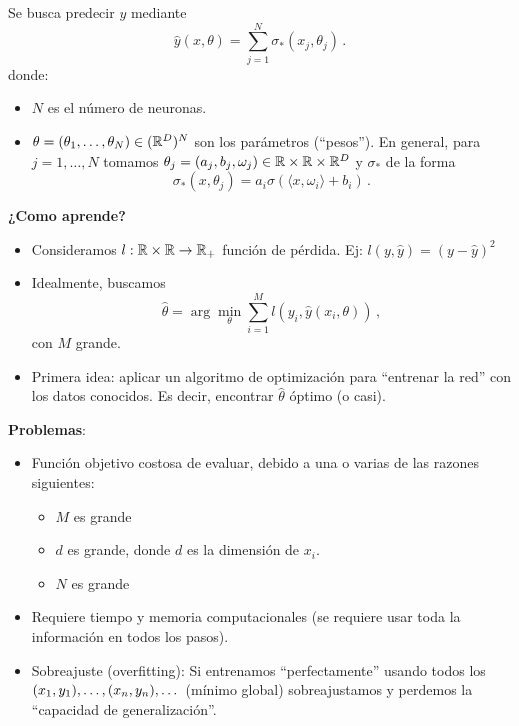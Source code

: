 \begin{example}
\label{ejemplo:red_neuronal}
Se busca predecir $y$ mediante
$$ \hat{y}(x,\theta) = \displaystyle\sum^N_{j=1}\sigma_*(x_j,\theta_j) \,.$$
donde:
\begin{itemize}
    \item $N$ es el número de neuronas.
    \item $\theta=(\theta_1,\dots,\theta_N)\in(\mathbb{R}^D)^N$ son los parámetros (``pesos'').
    \newline En general, para $j=1,\dots,N$ tomamos $\theta_j=(a_j,b_j,\omega_j)\in \mathbb{R}\times\mathbb{R}\times\mathbb{R}^D $ y $\sigma_*$ de la forma
    $$ \sigma_*(x,\theta_j)=a_i\sigma(\langle x,\omega_i\rangle+b_i) \,.$$
\end{itemize}
\textbf{¿Como aprende?}
\begin{itemize}
    \item Consideramos $l:\mathbb{R}\times\mathbb{R}\to\mathbb{R}_+$ función de pérdida.
    \newline Ej: $l(y,\hat{y})=(y-\hat{y})^2$
    \item Idealmente, buscamos
    $$ \hat{\theta}=\displaystyle\arg\min_\theta \sum^M_{i=1}l(y_i,\hat{y}(x_i,\theta))\,,$$
    con $M$ grande.
    \item Primera idea: aplicar un algoritmo de optimización para ``entrenar la red'' con los datos conocidos. Es decir, encontrar $\hat{\theta}$ óptimo (o casi).
\end{itemize}
\textbf{Problemas}:
\begin{itemize}
    \item Función objetivo costosa de evaluar, debido a una o varias de las razones siguientes:
    \begin{itemize}
        \item $M$ es grande
        \item $d$ es grande, donde $d$ es la dimensión de $x_i$.
        \item $N$ es grande
    \end{itemize}
    \item Requiere tiempo y memoria computacionales (se requiere usar toda la información en todos los pasos).
    \item Sobreajuste (overfitting): Si entrenamos ``perfectamente'' usando todos los $(x_1,y_1),\dots,(x_n,y_n),\dots$ (mínimo global) sobreajustamos y perdemos la ``capacidad de generalización''.

\end{itemize}
\end{example}
